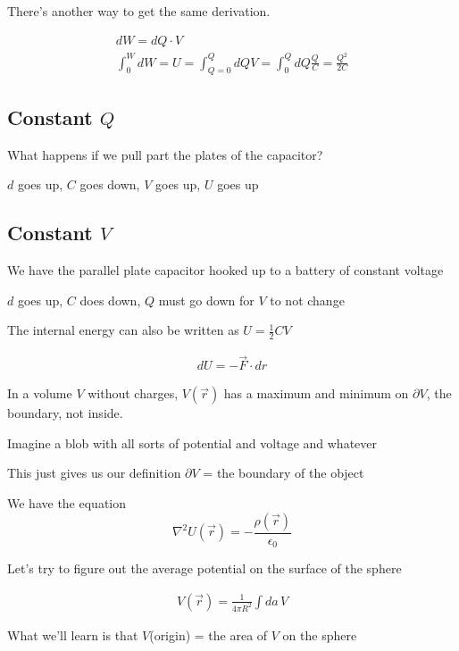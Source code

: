 \documentclass[fleqn]{report}
\newcommand{\del}{\partial}
\newcommand{\equations} [1] {
\begin{gather*}
#1
\end{gather*}
}
\begin{document}
There's another way to get the same derivation.
\equations{
    dW = dQ \cdot V 
    \\
    \int^W_0 dW = U = \int^Q_{Q = 0} dQ V = 
    \int^Q_0 dQ \frac{Q}{C} = \frac{Q^2}{2C}
}

\subsection{Constant $Q$}
What happens if we pull part the plates of the capacitor?

$d$ goes up, $C$ goes down, $V$ goes up, $U$ goes up

\subsection{Constant $V$}
We have the parallel plate capacitor hooked up to a battery of 
constant voltage 

$d$ goes up, $C$ does down, $Q$ must go down for $V$ to not change 

The internal energy can also be written as $U = \frac{1}{2} CV$

\equations{
    dU = - \vec F \cdot dr 
}


In a volume $V$ without charges, $V(\vec r)$ has 
a maximum and minimum on $\del V$, the boundary, not inside. 

Imagine a blob with all sorts of potential and voltage and whatever 

This just gives us our definition $\del V$ = the boundary of the object 

We have the equation 
\[
\nabla^2 U(\vec r) = -\frac{\rho(\vec r)}{\epsilon_0}
\]

Let's try to figure out the average potential on the surface of the sphere 
\equations{
    V(\vec r) 
    = 
    \frac{1}{4 \pi R^2}
    \int da \, V
}

What we'll learn is that $V$(origin) = the area of $V$ on the sphere 
\end{document}
